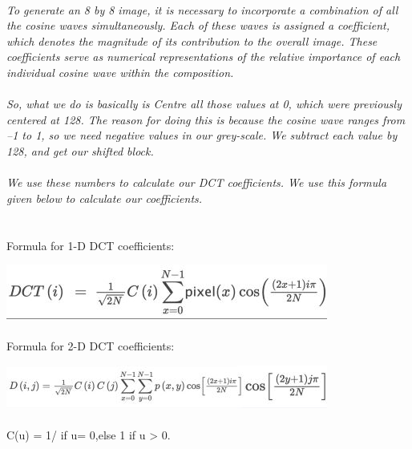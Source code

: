 \documentclass[12pt, letterpaper]{article}
\begin{document}
\paragraph{}\textit{To generate an 8 by 8 image, it is necessary to incorporate a combination of all the cosine waves simultaneously. Each of these waves is assigned a coefficient, which denotes the magnitude of its contribution to the overall image. These coefficients serve as numerical representations of the relative importance of each individual cosine wave within the composition.  }
\paragraph{}\textit{So, what we do is basically is Centre all those values at 0, which were previously centered at 128. The reason for doing this is because the cosine wave ranges from –1 to 1, so we need negative values in our grey-scale. We subtract each value by 128, and get our shifted block.}
\paragraph{}\textit{We use these numbers to calculate our DCT coefficients. We use this formula given below to calculate our coefficients.}
\paragraph{}\\Formula for 1-D DCT coefficients:
\begin{center}
    \includegraphics{F1} 
\end{center}
\paragraph{}Formula for 2-D DCT coefficients:
\begin{center}
    \includegraphics{F2.1} 
\end{center}
\paragraph{}C(u) = 1/\hspace{0.25cm} if\hspace{0.25cm}  u= 0,else\hspace{0.25cm} 1 \hspace{0.25cm} if\hspace{0.25cm}  u > 0.
\end{document}
